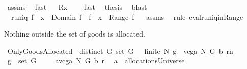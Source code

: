 \begin{isabellebody}
\ assms{\isacharparenleft}{}{\isacharparenright}\ \isamarkupfalse%
\ fast\isanewline
{}\isamarkupfalse%
\ \isamarkupfalse%
\ {\isachardoublequoteopen}R{\isacharbackquote}{\isacharbackquote}{\isacharbraceleft}x{\isacharbraceright}\ {\isasymnoteq}\ {\isacharbraceleft}{\isacharbraceright}{\isachardoublequoteclose}\ \isamarkupfalse%
\ fast\ \isamarkupfalse%
\ {\isacharquery}thesis\ \isamarkupfalse%
\ blast\ \isamarkupfalse%
%
\endisatagproof
{\isafoldproof}%
%
\isadelimproof
%
\endisadelimproof
\isanewline
\isanewline
{}\isamarkupfalse%
\ \ {\isachardoublequoteopen}runiq\ f{\isachardoublequoteclose}\ \ {\isachardoublequoteopen}x\ {\isasymin}\ Domain\ f{\isachardoublequoteclose}\ \ {\isachardoublequoteopen}{\isacharparenleft}f\ {\isacharcomma}{\isacharcomma}\ x{\isacharparenright}\ {\isasymin}\ Range\ f{\isachardoublequoteclose}%
\isadelimproof
\ %
\endisadelimproof
%
\isatagproof
{}\isamarkupfalse%
\ assms\ \isanewline
{}\isamarkupfalse%
\ {\isacharparenleft}rule\ eval{\isacharunderscore}runiq{\isacharunderscore}in{\isacharunderscore}Range{\isacharparenright}%
\endisatagproof
{\isafoldproof}%
%
\isadelimproof
%
\endisadelimproof
%
\begin{isamarkuptext}%
Nothing outside the set of goods is allocated.%
\end{isamarkuptext}%
\isamarkuptrue%
\isamarkupfalse%
\ OnlyGoodsAllocated{\isacharcolon}\ \ {\isachardoublequoteopen}distinct\ G{\isachardoublequoteclose}\ {\isachardoublequoteopen}set\ G\ {\isasymnoteq}\ {\isacharbraceleft}{\isacharbraceright}{\isachardoublequoteclose}\ {\isachardoublequoteopen}finite\ N{\isachardoublequoteclose}\ {\isachardoublequoteopen}g\ {\isasymin}\ {\isacharparenleft}vcga{\isacharprime}\ N\ G\ b\ r{\isacharparenright}{\isacharcomma}{\isacharcomma}{\isacharcomma}n{\isachardoublequoteclose}\ \isanewline
{}\ {\isachardoublequoteopen}g\ {\isasymin}\ set\ G{\isachardoublequoteclose}\ \isanewline
%
\isadelimproof
%
\endisadelimproof
%
\isatagproof
{}\isamarkupfalse%
\ {\isacharminus}\ \isanewline
{}\isamarkupfalse%
\ {\isacharquery}a{\isacharequal}{\isachardoublequoteopen}vcga{\isacharprime}\ N\ G\ b\ r{\isachardoublequoteclose}\ \isanewline
{}\isamarkupfalse%
\ {\isachardoublequoteopen}{\isacharquery}a\ {\isasymin}\ allocationsUniverse{\isachardoublequoteclose}\ \isamarkupfalse%

\end{isabellebody}

